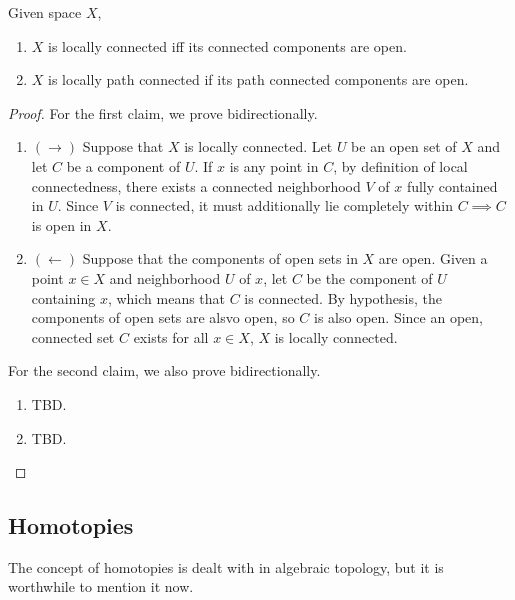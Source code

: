   \begin{theorem}
    Given space $X$, 
    \begin{enumerate}
      \item $X$ is locally connected iff its connected components are open. 
      \item $X$ is locally path connected if its path connected components are open. 
    \end{enumerate}
  \end{theorem}
  \begin{proof}
    For the first claim, we prove bidirectionally. 
    \begin{enumerate}
      \item $(\rightarrow)$ Suppose that $X$ is locally connected. Let $U$ be an open set of $X$ and let $C$ be a component of $U$. If $x$ is any point in $C$, by definition of local connectedness, there exists a connected neighborhood $V$ of $x$ fully contained in $U$. Since $V$ is connected, it must additionally lie completely within $C \implies C$ is open in $X$. 
      \item $(\leftarrow)$ Suppose that the components of open sets in $X$ are open. Given a point $x \in X$ and neighborhood $U$ of $x$, let $C$ be the component of $U$ containing $x$, which means that $C$ is connected. By hypothesis, the components of open sets are alsvo open, so $C$ is also open. Since an open, connected set $C$ exists for all $x \in X$, $X$ is locally connected. 
    \end{enumerate}
    For the second claim, we also prove bidirectionally. 
    \begin{enumerate}
      \item TBD. 
      \item TBD. 
    \end{enumerate}
  \end{proof}

\subsection{Homotopies}

  The concept of homotopies is dealt with in algebraic topology, but it is worthwhile to mention it now. 

